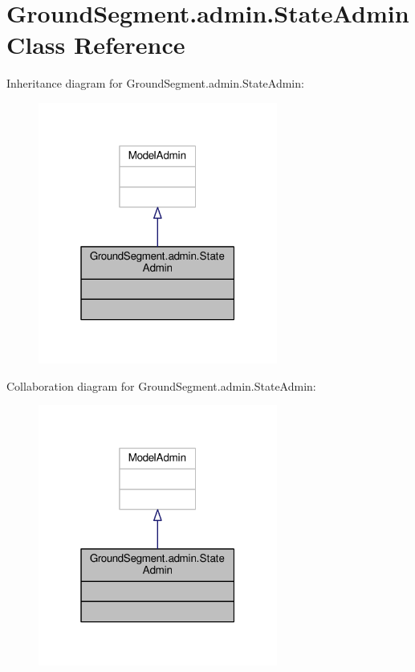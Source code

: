 \hypertarget{class_ground_segment_1_1admin_1_1_state_admin}{}\section{Ground\+Segment.\+admin.\+State\+Admin Class Reference}
\label{class_ground_segment_1_1admin_1_1_state_admin}


Inheritance diagram for Ground\+Segment.\+admin.\+State\+Admin\+:\nopagebreak
\begin{figure}[H]
\begin{center}
\leavevmode
\includegraphics[width=223pt]{class_ground_segment_1_1admin_1_1_state_admin__inherit__graph}
\end{center}
\end{figure}


Collaboration diagram for Ground\+Segment.\+admin.\+State\+Admin\+:\nopagebreak
\begin{figure}[H]
\begin{center}
\leavevmode
\includegraphics[width=223pt]{class_ground_segment_1_1admin_1_1_state_admin__coll__graph}
\end{center}
\end{figure}


